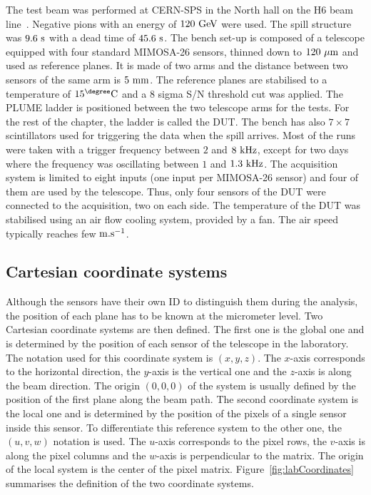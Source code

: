     The test beam was performed at \gls{CERN}-\gls{SPS} in the North hall on the H6 beam line~\cite{SPS}.
    Negative pions with an energy of $120~\rm{GeV}$ were used.
    The spill structure was $9.6~\rm{s}$ with a dead time of $45.6~\rm{s}$. 
    The bench set-up is composed of a telescope equipped with four standard \gls{MIMOSA}-26 sensors, thinned down to $120~\rm{\mu m}$ and used as reference planes.
    It is made of two arms and the distance between two sensors of the same arm is $5~\rm{mm}$.
    The reference planes are stabilised to a temperature of $15^{\degree}\rm{C}$ and a 8 sigma S/N threshold cut was applied.
    The \gls{PLUME} ladder is positioned between the two telescope arms for the tests.
    For the rest of the chapter, the ladder is called the \gls{DUT}.
    The bench has also $7 \times 7$ scintillators used for triggering the data when the spill arrives.
    Most of the runs were taken with a trigger frequency between $2$ and $8~\rm{kHz}$, except for two days where the frequency was oscillating between $1$ and $1.3~\rm{kHz}$.
    The acquisition system is limited to eight inputs (one input per \gls{MIMOSA}-26 sensor) and four of them are used by the telescope.
    Thus, only four sensors of the \gls{DUT} were connected to the acquisition, two on each side.
    The temperature of the \gls{DUT} was stabilised using an air flow cooling system, provided by a fan.
    The air speed typically reaches few $\rm{m.s}^{-1}$.

    \subsection{Cartesian coordinate systems}

    Although the sensors have their own ID to distinguish them during the analysis, the position of each plane has to be known at the micrometer level.
    Two Cartesian coordinate systems are then defined.
    The first one is the global one and is determined by the position of each sensor of the telescope in the laboratory.
    The notation used for this coordinate system is $(x,y,z)$.
    The $x$-axis corresponds to the horizontal direction, the $y$-axis is the vertical one and the $z$-axis is along the beam direction.
    The origin $(0,0,0)$ of the system is usually defined by the position of the first plane along the beam path.
    The second coordinate system is the local one and is determined by the position of the pixels of a single sensor inside this sensor.
    To differentiate this reference system to the other one, the $(u,v,w)$ notation is used.
    The $u$-axis corresponds to the pixel rows, the $v$-axis is along the pixel columns and the $w$-axis is perpendicular to the matrix.
    The origin of the local system is the center of the pixel matrix.
    Figure~\ref{fig:labCoordinates} summarises the definition of the two coordinate systems.

